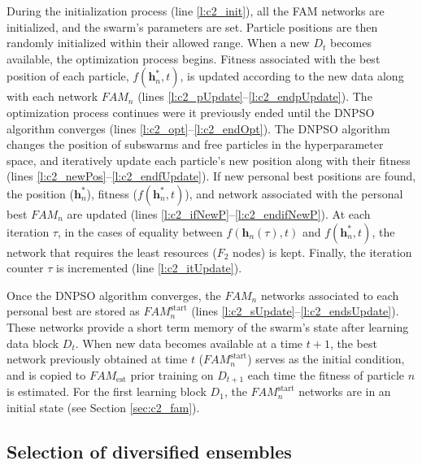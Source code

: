 During the initialization process (line \ref{l:c2_init}), all the FAM networks are initialized, and the swarm's parameters are set.
Particle positions are then randomly initialized within their allowed range.
When a new $D_t$ becomes available, the optimization process begins.
Fitness associated with the best position of each particle, $f(\textbf{h}^*_n,t)$, is updated according to the new data along with each network $\textit{FAM}_n$ (lines \ref{l:c2_pUpdate}--\ref{l:c2_endpUpdate}).
The optimization process continues were it previously ended until the DNPSO algorithm converges (lines \ref{l:c2_opt}--\ref{l:c2_endOpt}).
The DNPSO algorithm changes the position of subswarms and free particles in the hyperparameter space, and iteratively update each particle's new position along with their fitness (lines \ref{l:c2_newPos}--\ref{l:c2_endfUpdate}).
If new personal best positions are found, the position ($\textbf{h}^*_n$), fitness ($f(\textbf{h}^*_n,t)$), and network associated with the personal best $\textit{FAM}_n$ are updated (lines \ref{l:c2_ifNewP}--\ref{l:c2_endifNewP}).
At each iteration $\tau$, in the cases of equality between $f(\textbf{h}_n(\tau),t)$ and $f(\textbf{h}^*_n,t)$, the network that requires the least resources ($F_2$ nodes) is kept.
Finally, the iteration counter $\tau$ is incremented (line \ref{l:c2_itUpdate}).

Once the DNPSO algorithm converges, the $\textit{FAM}_n$ networks associated to each personal best are stored as $\textit{FAM}_n^\text{start}$ (lines \ref{l:c2_sUpdate}--\ref{l:c2_endsUpdate}).
These networks provide a short term memory of the swarm's state after learning data block $D_{t}$.
When new data becomes available at a time $t+1$, the best network previously obtained at time $t$ ($\textit{FAM}_n^\text{start}$) serves as the initial condition, and is copied to $\textit{FAM}_\text{est}$ prior training on $D_{t+1}$ each time the fitness of particle $n$ is estimated.
For the first learning block $D_1$, the $\textit{FAM}_n^\text{start}$ networks are in an initial state (see Section \ref{sec:c2_fam}).

\subsection{Selection of diversified ensembles}
\label{sec:c2_sel}

